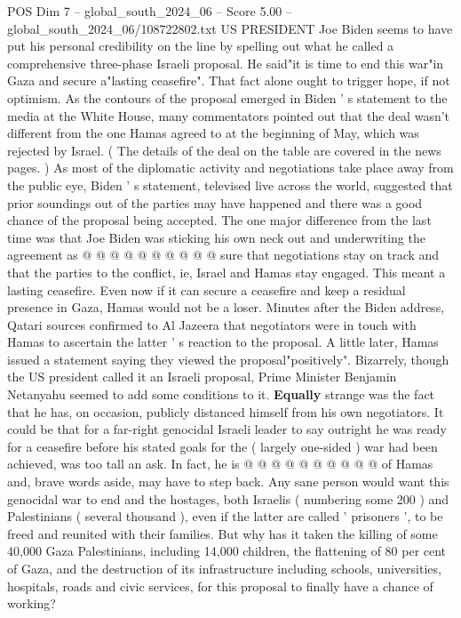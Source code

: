 \begin{textsample}{POS Dim 7 – global\_south\_2024\_06 – Score 5.00 – global\_south\_2024\_06/108722802.txt}  \label{ex:f7_pos_246}
US PRESIDENT Joe Biden seems to have put his personal credibility on the line by spelling out what he called a comprehensive three-phase Israeli proposal.
He said"it is time to end this war"in Gaza and secure a"lasting ceasefire".
That fact alone ought to trigger hope, if not optimism.
As the contours of the proposal emerged in Biden ' s statement to the media at the White House, many commentators pointed out that the deal wasn't different from the one Hamas agreed to at the beginning of May, which was rejected by Israel. ( The details of the deal on the table are covered in the news pages. ) As most of the diplomatic activity and negotiations take place away from the public eye, Biden ' s statement, televised live across the world, suggested that prior soundings out of the parties may have happened and there was a good chance of the proposal being accepted.
The one major difference from the last time was that Joe Biden was sticking his own neck out and underwriting the agreement as @ @ @ @ @ @ @ @ @ @ sure that negotiations stay on track and that the parties to the conflict, ie, Israel and Hamas stay engaged.
This meant a lasting ceasefire.
Even now if it can secure a ceasefire and keep a residual presence in Gaza, Hamas would not be a loser.
Minutes after the Biden address, Qatari sources confirmed to Al Jazeera that negotiators were in touch with Hamas to ascertain the latter ' s reaction to the proposal.
A little later, Hamas issued a statement saying they viewed the proposal"positively".
Bizarrely, though the US president called it an Israeli proposal, Prime Minister Benjamin Netanyahu seemed to add some conditions to it. \textbf{Equally} strange was the fact that he has, on occasion, publicly distanced himself from his own negotiators.
It could be that for a far-right genocidal Israeli leader to say outright he was ready for a ceasefire before his stated goals for the ( largely one-sided ) war had been achieved, was too tall an ask.
In fact, he is @ @ @ @ @ @ @ @ @ @ of Hamas and, brave words aside, may have to step back.
Any sane person would want this genocidal war to end and the hostages, both Israelis ( numbering some 200 ) and Palestinians ( several thousand ), even if the latter are called ' prisoners ', to be freed and reunited with their families.
But why has it taken the killing of some 40,000 Gaza Palestinians, including 14,000 children, the flattening of 80 per cent of Gaza, and the destruction of its infrastructure including schools, universities, hospitals, roads and civic services, for this proposal to finally have a chance of working?

\end{textsample}
